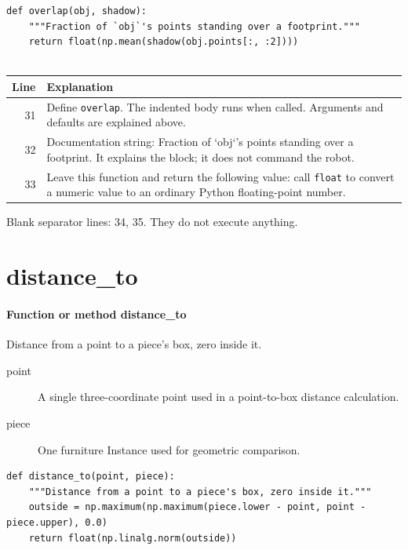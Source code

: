 \documentclass[11pt,a4paper]{book}
\begin{document}
\begin{lstlisting}[firstnumber=31]
def overlap(obj, shadow):
    """Fraction of `obj`'s points standing over a footprint."""
    return float(np.mean(shadow(obj.points[:, :2])))


\end{lstlisting}

\begin{longtable}{r p{}}

\textbf{Line} & \textbf{Explanation} \\ \hline \endhead

31 & Define \texttt{overlap}. The indented body runs when called. Arguments and defaults are explained above. \\

32 & Documentation string: Fraction of `obj`'s points standing over a footprint. It explains the block; it does not command the robot. \\

33 & Leave this function and return the following value: call \texttt{float} to convert a numeric value to an ordinary Python floating-point number. \\

\end{longtable}

Blank separator lines: 34, 35. They do not execute anything.

\section{distance\_to}

\paragraph{Function or method distance\_to}
Distance from a point to a piece's box, zero inside it.

\begin{description}
\item[point] A single three-coordinate point used in a point-to-box distance calculation.
\item[piece] One furniture Instance used for geometric comparison.
\end{description}

\begin{lstlisting}[firstnumber=36]
def distance_to(point, piece):
    """Distance from a point to a piece's box, zero inside it."""
    outside = np.maximum(np.maximum(piece.lower - point, point - piece.upper), 0.0)
    return float(np.linalg.norm(outside))


\end{lstlisting}
\end{document}
